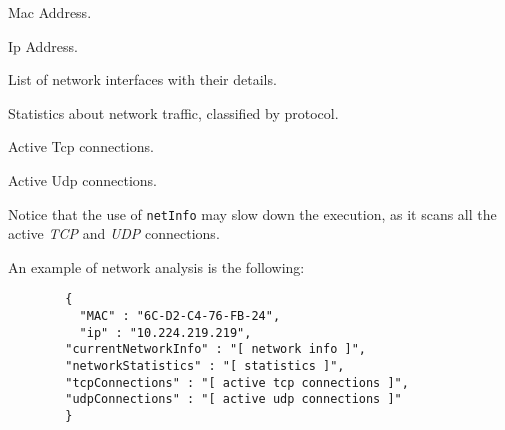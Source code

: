 \begin{description}
  \setlength\itemsep{1em}
  \item [Mac] Mac Address.
  \item [Ip] Ip Address.
  \item [CurrentNetworkInfo] List of network interfaces with their details.
  \item [NetworkStatistics] Statistics about network traffic, classified by protocol.
  \item [TcpConnections] Active Tcp connections.
  \item [UdpConnections] Active Udp connections.
 \end{description}

Notice that the use of \texttt{netInfo} may slow down the execution, as it scans all the active \textit{TCP} and \textit{UDP} connections.

An example of network analysis is the following:

\begin{description}
	\item 
		\begin{verbatim}
		{
		  "MAC" : "6C-D2-C4-76-FB-24",
		  "ip" : "10.224.219.219",
	 	"currentNetworkInfo" : "[ network info ]",
	 	"networkStatistics" : "[ statistics ]",
	 	"tcpConnections" : "[ active tcp connections ]",
	 	"udpConnections" : "[ active udp connections ]"
		}
	\end{verbatim}
\end{description}